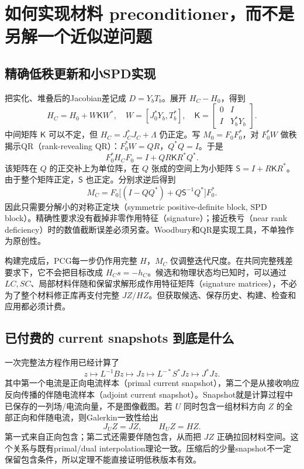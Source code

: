 \section{如何实现材料 preconditioner，而不是另解一个近似逆问题}
\subsection{精确低秩更新和小SPD实现}
把实化、堆叠后的Jacobian差记成 $D=Y_bT_b$。展开 $H_C-H_0$，得到
\begin{equation}
 H_C=H_0+W\mathsf K W^*,\quad
 W=[J_0^*Y_b,T_b^*],\quad
 \mathsf K=\begin{bmatrix}0&I\\I&Y_b^*Y_b\end{bmatrix}.
\end{equation}
中间矩阵 $\mathsf K$ 可以不定，但 $H_C=J_C^*J_C+\Lambda$ 仍正定。写 $M_0=F_0F_0^*$，对 $F_0^*W$ 做秩揭示QR（rank-revealing QR）：$F_0^*W=QR$，$Q^*Q=I$。于是
\begin{equation}
 F_0^*H_CF_0=I+QR\mathsf KR^*Q^*.
\end{equation}
该矩阵在 $Q$ 的正交补上为单位阵，在 $Q$ 张成的空间上为小矩阵 $\mathsf S=I+R\mathsf KR^*$。由于整个矩阵正定，$\mathsf S$ 也正定。分别求逆后得到
\begin{equation}
 \boxed{M_C=F_0\bigl[(I-QQ^*)+Q\mathsf S^{-1}Q^*\bigr]F_0^*.}
\end{equation}
因此只需要分解小的对称正定块（symmetric positive-definite block, SPD block）。精确性要求没有截掉非零作用特征（signature）；接近秩亏（near rank deficiency）时的数值截断误差必须另查。Woodbury和QR是实现工具，不单独作为原创性。

构建完成后，PCG每一步仍作用完整 $H$，$M_C$ 仅调整迭代尺度。在共同完整残差要求下，它不会把目标改成 $H_Cs=-h_C$。候选和物理状态均已知时，可以通过 $LC,SC$、局部材料伴随和保留求解形成作用特征矩阵（signature matrices），不必为了整个材料修正库再支付完整 $JZ/HZ$。但获取候选、保存历史、构建、检查和应用都必须计费。

\subsection{已付费的 current snapshots 到底是什么}
一次完整法方程作用已经计算了
\begin{equation}
 z\longmapsto L^{-1}Bz\longmapsto Jz
 \longmapsto L^{-*}S^*Jz\longmapsto J^*Jz.
\end{equation}
其中第一个电流是正向电流样本（primal current snapshot），第二个是从接收响应反向传播的伴随电流样本（adjoint current snapshot）。Snapshot就是计算过程中已保存的一列场/电流向量，不是图像截图。若 $U$ 同时包含一组材料方向 $Z$ 的全部正向和伴随电流，则Galerkin一致性给出
\begin{equation}
 J_UZ=JZ,\qquad H_UZ=HZ.
\end{equation}
第一式来自正向包含；第二式还需要伴随包含，从而把 $JZ$ 正确拉回材料空间。这个关系与既有primal/dual interpolation理论一致。压缩后的少量snapshot不一定保留包含条件，所以定理不能直接证明低秩版本有效。

